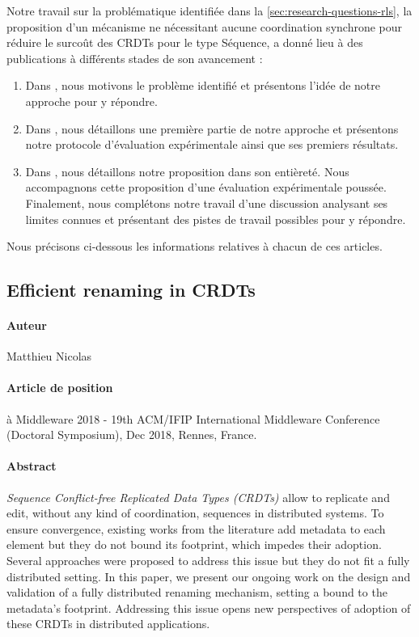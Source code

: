 Notre travail sur la problématique identifiée dans la \autoref{sec:research-questions-rls}, \ie la proposition d'un mécanisme ne nécessitant aucune coordination synchrone pour réduire le surcoût des \acp{CRDT} pour le type Séquence, a donné lieu à des publications à différents stades de son avancement :
\begin{enumerate}
    \item Dans \cite{2018-rls-middleware-nicolas}, nous motivons le problème identifié et présentons l'idée de notre approche pour y répondre.
    \item Dans \cite{2020-rls-papoc-nicolas}, nous détaillons une première partie de notre approche et présentons notre protocole d'évaluation expérimentale ainsi que ses premiers résultats.
    \item Dans \cite{2022-rls-tpds-nicolas}, nous détaillons notre proposition dans son entièreté.
        Nous accompagnons cette proposition d'une évaluation expérimentale poussée.
        Finalement, nous complétons notre travail d'une discussion analysant ses limites connues et présentant des pistes de travail possibles pour y répondre.
\end{enumerate}
Nous précisons ci-dessous les informations relatives à chacun de ces articles.

\subsection*{Efficient renaming in CRDTs \cite{2018-rls-middleware-nicolas}}

\paragraph{Auteur} Matthieu Nicolas

\paragraph{Article de position} à Middleware 2018 - 19th ACM/IFIP International Middleware Conference (Doctoral Symposium), Dec 2018, Rennes, France.

\paragraph{Abstract}
\emph{Sequence Conflict-free Replicated Data Types (CRDTs)} allow to replicate and edit, without any kind of coordination, sequences in distributed systems.
To ensure convergence, existing works from the literature add metadata to each element but they do not bound its footprint, which impedes their adoption.
Several approaches were proposed to address this issue but they do not fit a fully distributed setting.
In this paper, we present our ongoing work on the design and validation of a fully distributed renaming mechanism, setting a bound to the metadata's footprint.
Addressing this issue opens new perspectives of adoption of these CRDTs in distributed applications.

